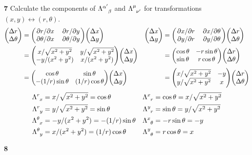 \documentclass[gr-notes.tex]{subfiles}
\begin{document}
\textbf{7}
Calculate the components of $\tensor{\Lambda}{^{\alpha'}_\beta}$ and $\tensor{\Lambda}{^\mu_{\nu'}}$ for transformations $(x, y) \leftrightarrow (r, \theta)$.
~
\begin{align*}
  \mqty( \Delta r \\ \Delta \theta ) &=
  \mqty( \pdv*{r}{x}      & \pdv*{r}{y} \\
         \pdv*{\theta}{x} & \pdv*{\theta}{y} )
  \mqty( \Delta x \\ \Delta y )
  &
  \mqty( \Delta x \\ \Delta y ) &=
  \mqty( \pdv*{x}{r} & \pdv*{x}{\theta} \\
         \pdv*{y}{r} & \pdv*{y}{\theta} )
  \mqty( \Delta r \\ \Delta \theta )
  \\ &=
  \mqty( x / \sqrt{x^2+y^2} & y / \sqrt{x^2 + y^2} \\
         -y / (x^2 + y^2) & x / (x^2 + y^2) )
  \mqty( \Delta x \\ \Delta y )
  &&=
  \mqty( \cos\theta & -r \sin\theta \\
         \sin\theta &  r \cos\theta )
  \mqty( \Delta r \\ \Delta \theta )
  \\ &=
  \mqty( \cos\theta & \sin\theta \\
         -(1/r) \sin\theta & (1/r) \cos\theta )
  \mqty( \Delta x \\ \Delta y )
  &&=
  \mqty( x / \sqrt{x^2 + y^2} & -y \\
         y / \sqrt{x^2 + y^2} &  x)
  \mqty( \Delta r \\ \Delta \theta )
\end{align*}
%
\begin{align*}
  \tensor{\Lambda}{^r_x} &= x / \sqrt{x^2 + y^2} = \cos\theta
  &
  \tensor{\Lambda}{^x_r} &= \cos\theta = x / \sqrt{x^2 + y^2}
  \\
  \tensor{\Lambda}{^r_y} &= y / \sqrt{x^2 + y^2} = \sin\theta
  &
  \tensor{\Lambda}{^y_r} &= \sin\theta = y / \sqrt{x^2 + y^2}
  \\
  \tensor{\Lambda}{^\theta_x} &= -y / (x^2 + y^2) = -(1/r) \sin\theta
  &
  \tensor{\Lambda}{^x_\theta} &= -r \sin\theta = -y
  \\
  \tensor{\Lambda}{^\theta_y} &= x / (x^2 + y^2) = (1/r) \cos\theta
  &
  \tensor{\Lambda}{^y_\theta} &= r \cos\theta = x
\end{align*}



\textbf{8}
\end{document}
